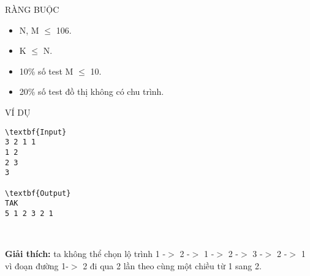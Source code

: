 RÀNG BUỘC
\begin{itemize}
	\item N, M  $\le$  106.
	\item K  $\le$  N.
	\item 10\% số test M  $\le$  10.
	\item 20\% số test đồ thị không có chu trình.
\end{itemize}
VÍ DỤ
\begin{verbatim}
\textbf{Input}
3 2 1 1
1 2
2 3
3

\textbf{Output}
TAK
5 1 2 3 2 1\end{verbatim}

 

\textbf{Giải thích:} ta không thể chọn lộ trình 1 -$>$ 2 -$>$ 1 -$>$ 2 -$>$ 3 -$>$ 2 -$>$ 1 vì đoạn đường 1-$>$ 2 đi qua 2 lần theo cùng một chiều từ 1 sang 2.